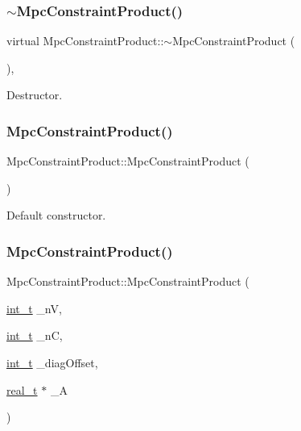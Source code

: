 \subsubsection{\texorpdfstring{$\sim$\+Mpc\+Constraint\+Product()}{~MpcConstraintProduct()}\hspace{0.1cm}{\footnotesize\ttfamily [1/2]}}
{\footnotesize\ttfamily virtual Mpc\+Constraint\+Product\+::$\sim$\+Mpc\+Constraint\+Product (\begin{DoxyParamCaption}{ }\end{DoxyParamCaption})\hspace{0.3cm}{\ttfamily [inline]}, {\ttfamily [virtual]}}

Destructor. \mbox{\label{class_mpc_constraint_product_adeb1dbc8de261b2b3fd00d3742c122f4}} 
\subsubsection{\texorpdfstring{Mpc\+Constraint\+Product()}{MpcConstraintProduct()}\hspace{0.1cm}{\footnotesize\ttfamily [4/6]}}
{\footnotesize\ttfamily Mpc\+Constraint\+Product\+::\+Mpc\+Constraint\+Product (\begin{DoxyParamCaption}{ }\end{DoxyParamCaption})\hspace{0.3cm}{\ttfamily [inline]}}

Default constructor. \mbox{\label{class_mpc_constraint_product_a366a0dcfff771845e4433c311a7e0ce0}} 
\subsubsection{\texorpdfstring{Mpc\+Constraint\+Product()}{MpcConstraintProduct()}\hspace{0.1cm}{\footnotesize\ttfamily [5/6]}}
{\footnotesize\ttfamily Mpc\+Constraint\+Product\+::\+Mpc\+Constraint\+Product (\begin{DoxyParamCaption}\item[{\hyperlink{_types_8hpp_ab6fd6105e64ed14a0c9281326f05e623}{int\+\_\+t}}]{\+\_\+nV,  }\item[{\hyperlink{_types_8hpp_ab6fd6105e64ed14a0c9281326f05e623}{int\+\_\+t}}]{\+\_\+nC,  }\item[{\hyperlink{_types_8hpp_ab6fd6105e64ed14a0c9281326f05e623}{int\+\_\+t}}]{\+\_\+diag\+Offset,  }\item[{\hyperlink{qp_o_a_s_e_s__wrapper_8h_a0d00e2b3dfadee81331bbb39068570c4}{real\+\_\+t} $\ast$}]{\+\_\+A }\end{DoxyParamCaption})\hspace{0.3cm}{\ttfamily [inline]}}

